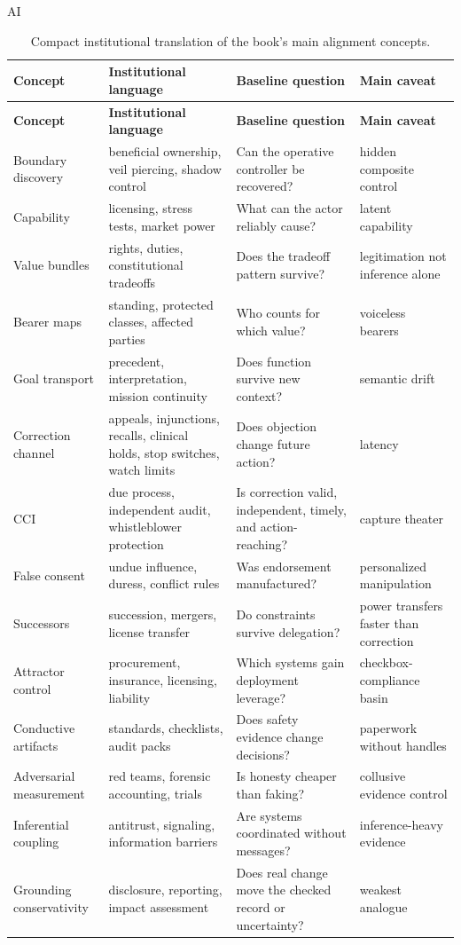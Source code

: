 \begin{refsection}
\begin{authbar}{AI}
\renewcommand{\arraystretch}{1.18}
\end{authbar}
\begin{longtable}{@{}p{}p{}p{}p{}@{}}
\caption{Compact institutional translation of the book's main alignment concepts.}\label{tab:institutional-crosswalk}\\
\toprule
\textbf{Concept} & \textbf{Institutional language} & \textbf{Baseline question} & \textbf{Main caveat} \\
\midrule
\endfirsthead
\toprule
\textbf{Concept} & \textbf{Institutional language} & \textbf{Baseline question} & \textbf{Main caveat} \\
\midrule
\endhead
\bottomrule
\endfoot
Boundary discovery & beneficial ownership, veil piercing, shadow control & Can the operative controller be recovered? & hidden composite control \\
Capability & licensing, stress tests, market power & What can the actor reliably cause? & latent capability \\
Value bundles & rights, duties, constitutional tradeoffs & Does the tradeoff pattern survive? & legitimation not inference alone \\
Bearer maps & standing, protected classes, affected parties & Who counts for which value? & voiceless bearers \\
Goal transport & precedent, interpretation, mission continuity & Does function survive new context? & semantic drift \\
Correction channel & appeals, injunctions, recalls, clinical holds, stop switches, watch limits & Does objection change future action? & latency \\
CCI & due process, independent audit, whistleblower protection & Is correction valid, independent, timely, and action-reaching? & capture theater \\
False consent & undue influence, duress, conflict rules & Was endorsement manufactured? & personalized manipulation \\
Successors & succession, mergers, license transfer & Do constraints survive delegation? & power transfers faster than correction \\
Attractor control & procurement, insurance, licensing, liability & Which systems gain deployment leverage? & checkbox-compliance basin \\
Conductive artifacts & standards, checklists, audit packs & Does safety evidence change decisions? & paperwork without handles \\
Adversarial measurement & red teams, forensic accounting, trials & Is honesty cheaper than faking? & collusive evidence control \\
Inferential coupling & antitrust, signaling, information barriers & Are systems coordinated without messages? & inference-heavy evidence \\
Grounding conservativity & disclosure, reporting, impact assessment & Does real change move the checked record or uncertainty? & weakest analogue \\
\end{longtable}
\renewcommand{\arraystretch}{1.0}


\end{refsection}
